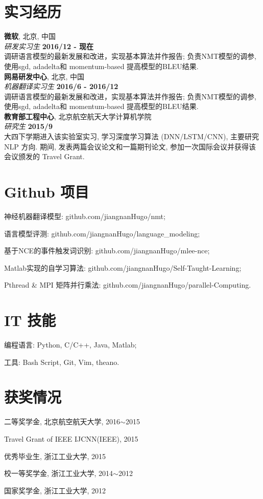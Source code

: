 \documentclass[margin,line]{resume}
\begin{document}
\begin{resume}
\section{实习经历}
{\bf 微软}, 北京, 中国 \\
{\em 研发实习生} \hfill {\bf  2016/12 - 现在}\\
调研语言模型的最新发展和改进，实现基本算法并作报告; 负责NMT模型的调参, 使用sgd, adadelta和 momentum-based 提高模型的BLEU结果.\\

{\bf 网易研发中心}, 北京, 中国 \\
{\em 机器翻译实习生} \hfill {\bf  2016/6 - 2016/12}\\
调研语言模型的最新发展和改进，实现基本算法并作报告; 负责NMT模型的调参, 使用sgd, adadelta和 momentum-based 提高模型的BLEU结果.\\


{\bf 教育部工程中心}, 北京航空航天大学计算机学院\\
{\em 研究生} \hfill {\bf 2015/9 }\\
大四下学期进入该实验室实习, 学习深度学习算法 (DNN/LSTM/CNN), 主要研究 NLP 方向. 期间, 发表两篇会议论文和一篇期刊论文, 参加一次国际会议并获得该会议颁发的 Travel Grant.


\section{ Github 项目}
{神经机器翻译模型:} github.com/jiangnanHugo/nmt;

{语言模型评测:} github.com/jiangnanHugo/language\_modeling;

{基于NCE的事件触发词识别:} github.com/jiangnanHugo/mlee-nce;

{Matlab实现的自学习算法:} github.com/jiangnanHugo/Self-Taught-Learning;

{Pthread \& MPI 矩阵并行乘法:} github.com/jiangnanHugo/parallel-Computing.


\section{IT 技能}

编程语言: Python, C/C++, Java, Matlab;

工具: Bash Script, Git, Vim, theano.


\section{获奖情况}
二等奖学金, 北京航空航天大学, 2016$\sim$2015

Travel Grant of IEEE IJCNN(IEEE), 2015

优秀毕业生, 浙江工业大学, 2015

校一等奖学金, 浙江工业大学, 2014$\sim$2012

国家奖学金, 浙江工业大学, 2012


\end{resume}
\end{document}

